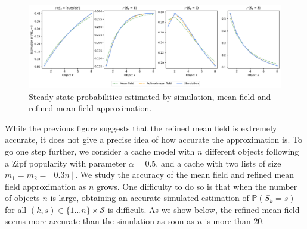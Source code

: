 \documentclass[acmsmall]{acmart}
\newcommand\calS{\mathcal{S}}
\newcommand\Proba[1]{\mathbb{P}\left(#1\right)} %
\newcommand\floor[1]{\left\lfloor#1\right\rfloor}
\begin{document}
\begin{figure}[ht]
\includegraphics[width=\linewidth]{cache_steady_state}
  \caption{Steady-state probabilities estimated by simulation, mean field and refined mean field approximation.}
  \label{fig:steady_state_cache}
\end{figure}

While the previous figure suggests that the refined mean field is extremely accurate, it does not give a precise idea of how accurate the approximation is. To go one step further, we consider a cache model with $n$ different objects following a Zipf popularity with parameter $\alpha=0.5$, and a cache with two lists of size $m_1=m_2=\floor{0.3n}$. We study the accuracy of the mean field and refined mean field approximation as $n$ grows. One difficulty to do so is that when the number of objects $n$ is large, obtaining an accurate simulated estimation of $\Proba{S_k=s}$ for all $(k, s) \in\{1\dots n\}\times \calS$ is difficult. As we show below, the refined mean field seems more accurate than the simulation as soon as $n$ is more than $20$. 
\end{document}
